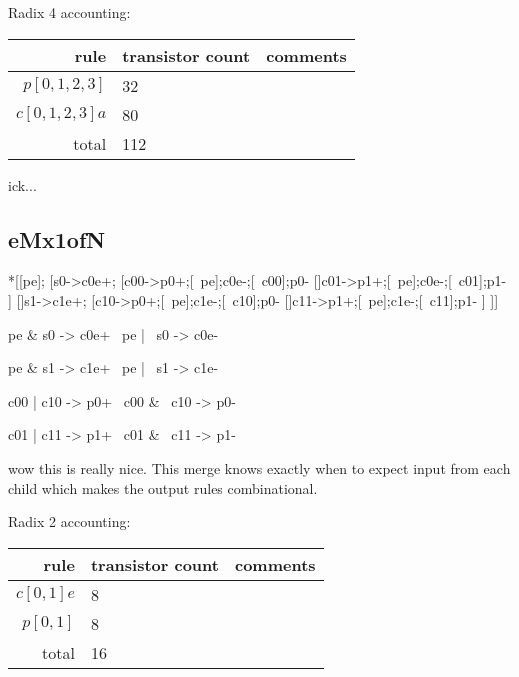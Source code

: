 \documentclass{article}
\begin{document}
\noindent Radix 4 accounting: 

\begin{center}
    \begin{tabular}{|r|l|l|}
    \hline
    rule & transistor count & comments \\ \hline
    $p[0,1,2,3]$ & 32 & \\ \hline
    $c[0,1,2,3]a$ & 80 & \\ \hline
    \hline total & 112 & \\ \hline
    \end{tabular}
\end{center}

ick...

\subsection{eMx1ofN}

\begin{hse}
*[[pe];
  [s0->c0e+;
    [c00->p0+;[~pe];c0e-;[~c00];p0-
    []c01->p1+;[~pe];c0e-;[~c01];p1-
    ]
  []s1->c1e+;
    [c10->p0+;[~pe];c1e-;[~c10];p0-
    []c11->p1+;[~pe];c1e-;[~c11];p1-
    ]
 ]]
\end{hse}

\begin{prs2}
pe & s0 -> c0e+
~pe | ~s0 -> c0e-

pe & s1 -> c1e+
~pe | ~s1 -> c1e-
\end{prs2}

\begin{prs2}
c00 | c10 -> p0+
~c00 & ~c10 -> p0-

c01 | c11 -> p1+
~c01 & ~c11 -> p1-
\end{prs2}

wow this is really nice. This merge knows exactly when to expect input from each child which makes the output rules combinational.

\noindent Radix 2 accounting: 

\begin{center}
    \begin{tabular}{|r|l|l|}
    \hline
    rule & transistor count & comments \\ \hline
    $c[0,1]e$ & 8 & \\ \hline
    $p[0,1]$ & 8 & \\ \hline
    \hline total & 16 & \\ \hline
    \end{tabular}
\end{center}
\end{document}

